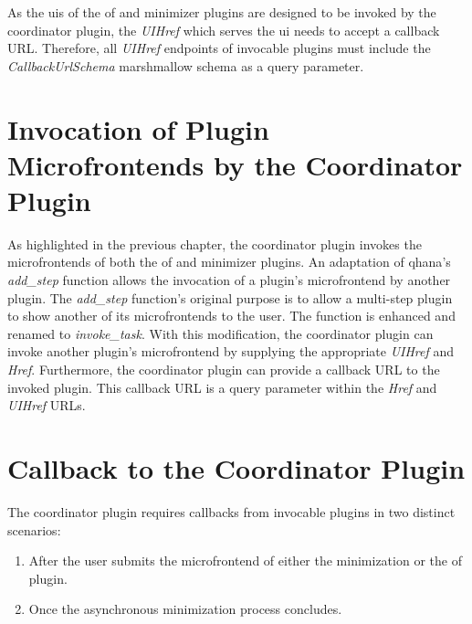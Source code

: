 \documentclass[
  a4paper,  %
  twoside,  %
  bibliography=totoc,
  headsepline,
  cleardoublepage=empty,
  parskip=half,
  draft=false
]{scrbook}
\begin{document}
\noindent\begin{minipage}{\linewidth}
  
\end{minipage}

As the \glspl{ui} of the \gls{of} and minimizer plugins are designed to be invoked by the coordinator plugin, the \emph{UIHref} which serves the \gls{ui} needs to accept a callback URL.
Therefore, all \emph{UIHref} endpoints of invocable plugins must include the \emph{CallbackUrlSchema} marshmallow schema as a query parameter.



\section{Invocation of Plugin Microfrontends by the Coordinator Plugin}
\label{sec:invocationOfPluginMicrofrontendsByTheCoordinatorPlugin}

As highlighted in the previous chapter, the coordinator plugin invokes the microfrontends of both the \gls{of} and minimizer plugins.
An adaptation of \gls{qhana}'s \emph{add\_step} function allows the invocation of a plugin's microfrontend by another plugin.
The \emph{add\_step} function's original purpose is to allow a multi-step plugin to show another of its microfrontends to the user.
The function is enhanced and renamed to \emph{invoke\_task}.
With this modification, the coordinator plugin can invoke another plugin's microfrontend by supplying the appropriate \emph{UIHref} and \emph{Href}.
Furthermore, the coordinator plugin can provide a callback URL to the invoked plugin.
This callback URL is a query parameter within the \emph{Href} and \emph{UIHref} URLs.

\section{Callback to the Coordinator Plugin}
\label{sec:implementationOfCallbacksToTheCoordinatorPlugin}

The coordinator plugin requires callbacks from invocable plugins in two distinct scenarios:
\begin{enumerate}
    \item After the user submits the microfrontend of either the minimization or the \gls{of} plugin.
    \item Once the asynchronous minimization process concludes.
\end{enumerate}
\end{document}
